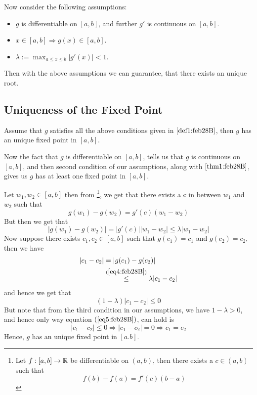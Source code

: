 \begin{defn}\label{def1:feb28B}
    Now consider the following assumptions: 

        \begin{itemize}
            \item $g$ is differentiable on $[a,b]$, and further $g'$ is continuous on $[a,b]$.
            
            \item $x \in [a,b] \Rightarrow g(x) \in [a,b]$.
            
            \item $\displaystyle{\lambda := \max_{a \leq x \leq b} |g'(x)| < 1}$.
        \end{itemize}    
\end{defn}
Then with the above assumptions we can guarantee, that there exists an unique root.

\subsection{Uniqueness of the Fixed Point}

\begin{thm}\label{thm2:feb28B}
    Assume that $g$ satisfies all the above conditions given in  $\ref{def1:feb28B}$, then $g$ has an unique fixed point in $[a,b]$.
\end{thm}
\begin{prf}
    Now the fact that $g$ is differentiable on $[a,b]$, tells us that $g$ is continuous on $[a,b]$, and then second condition of our assumptions, along with  $\ref{thm1:feb28B}$, gives us $g$ has at least one fixed point in $[a,b]$.     

    Let $w_1, w_2 \in [a,b]$ then from \footnote[1]{ Let $f : [a,b] \to \mathbb{R}$ be differentiable on $(a,b)$, then there exists a $c \in (a,b)$ such that \[ f(b)-f(a) = f'(c) (b-a) \] }, we get that there exists a $c$ in between $w_1$ and $w_2$ such that 
    \[
        g(w_1) - g(w_2) = g'(c) (w_1 - w_2)     
    \]
    But then we get that 
    \begin{equation}\label{eq4:feb28B}
        |g(w_1) - g(w_2)| = |g'(c)| |w_1 - w_2| \leq \lambda |w_1 - w_2|
    \end{equation}
    Now suppose there exists $c_1, c_2 \in [a,b]$ such that $g(c_1) = c_1$ and $g(c_2) = c_2$, then we have 
    \begin{align*}
        |c_1 - c_2| &= |g(c_1) - g(c_2)| \\ 
                    &\overset{(\ref{eq4:feb28B})}{\leq} \lambda |c_1 - c_2|
    \end{align*}
    and hence we get that
    \begin{equation}\label{eq5:feb28B}
        (1-\lambda)|c_1 - c_2| \leq 0        
    \end{equation} 
    But note that from the third condition in our assumptions, we have $1 -\lambda > 0$, and hence only way equation $(\ref{eq5:feb28B})$, can hold is 
    \[
        |c_1 - c_2| \leq 0 \Rightarrow |c_1 - c_2| = 0 \Rightarrow c_1 = c_2  
    \]
    Hence, $g$ has an unique fixed point in $[a.b]$.
\end{prf}